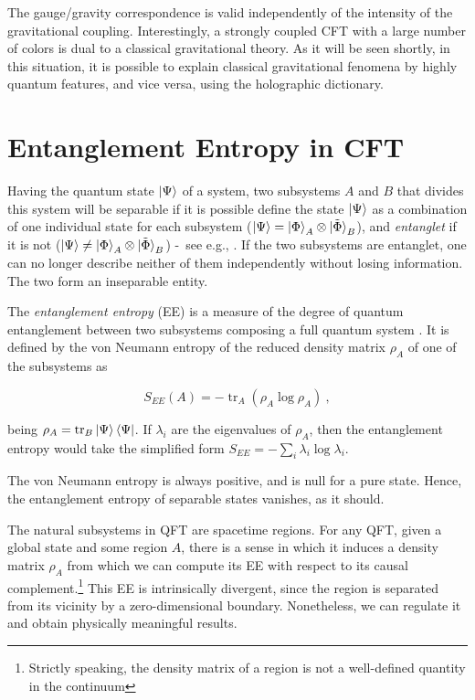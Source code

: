 \documentclass[twocolumn]{revtex4}
\providecommand{\eq}[2]{
    \begin{equation}
        #2
    \label{eq:#1}
    \end{equation}
}
\DeclareMathOperator{\tr}{tr}
\begin{document}
The gauge/gravity correspondence is valid independently of the intensity of the gravitational coupling. Interestingly, a strongly coupled CFT with a large number of colors is dual to a classical gravitational theory. As it will be seen shortly, in this situation, it is possible to explain classical gravitational fenomena by highly quantum features, and vice versa, using the holographic dictionary.


\section{Entanglement Entropy in CFT} \label{s:EE_CFT}

Having the quantum state $\ket{\Psi}$ of a system, two subsystems $A$ and $B$ that divides this system will be separable if it is possible define the state $\ket{\Psi}$ as a combination of one individual state for each subsystem ($\ket{\Psi} = \ket{\Phi}_A \otimes \ket{\tilde{\Phi}}_B$), and \textit{entanglet} if it is not ($\ket{\Psi} \neq \ket{\Phi}_A \otimes \ket{\tilde{\Phi}}_B$) -~see e.g., \cite{schrodinger_discussion_1935}. If the two subsystems are entanglet, one can no longer describe neither of them independently without losing information. The two form an inseparable entity.

The \textit{entanglement entropy} (EE) is a measure of the degree of quantum entanglement between two subsystems composing a full quantum system \cite{nishioka_entanglement_2018}. It is defined by the von Neumann entropy of the reduced density matrix $\rho_A$ of one of the subsystems as
\eq{EE}{
    S_{EE}(A) = - \tr_A ( \rho_A \log \rho_A ) \ ,
}
being $\rho_A = \tr_B \ket{\Psi}\bra{\Psi}$. If $\lambda_i$ are the eigenvalues of $\rho_A$, then the entanglement entropy would take the simplified form $S_{EE} = - \sum_i \lambda_i \log \lambda_i$.

The von Neumann entropy is always positive, and is null for a pure state. Hence, the entanglement entropy of separable states vanishes, as it should. 


The natural subsystems in QFT are spacetime regions. For any QFT, given a global state and some region $A$, there is a sense in which it induces a density matrix $\rho_A$ from which we can compute its EE with respect to its causal complement.\footnote{Strictly speaking, the density matrix of a region is not a well-defined quantity in the continuum} 
This EE is intrinsically divergent, since the region is separated from its vicinity by a zero-dimensional boundary. Nonetheless, we can regulate it and obtain physically meaningful results.
\end{document}
